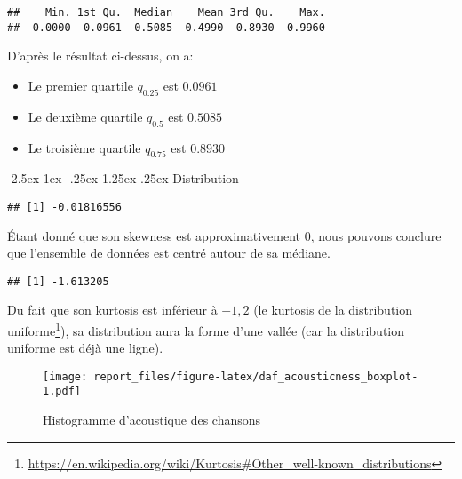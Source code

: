 \documentclass[
  12pt,
]{article}
\makeatletter
\newenvironment{Shaded}{\begin{snugshade}}{\end{snugshade}}
\newcommand{\FunctionTok}[1]{\textcolor[rgb]{0.00,0.00,0.00}{#1}}
\newcommand{\NormalTok}[1]{#1}
\newcommand{\SpecialCharTok}[1]{\textcolor[rgb]{0.00,0.00,0.00}{#1}}
\providecommand{\tightlist}{%
  \setlength{\itemsep}{0pt}\setlength{\parskip}{0pt}}
\renewcommand\paragraph{\@startsection{paragraph}{4}{\z@}%
        {-2.5ex\@plus -1ex \@minus -.25ex}%
        {1.25ex \@plus .25ex}%
        {\normalfont\normalsize\bfseries}}
\makeatother
\begin{document}
\begin{verbatim}
##    Min. 1st Qu.  Median    Mean 3rd Qu.    Max. 
##  0.0000  0.0961  0.5085  0.4990  0.8930  0.9960
\end{verbatim}

D'après le résultat ci-dessus, on a:

\begin{itemize}
\tightlist
\item
  Le premier quartile \(q_{0.25}\) est \(0.0961\)
\item
  Le deuxième quartile \(q_{0.5}\) est \(0.5085\)
\item
  Le troisième quartile \(q_{0.75}\) est \(0.8930\)
\end{itemize}

\hypertarget{distribution}{%
\paragraph{Distribution}\label{distribution}}

\begin{Shaded}
\end{Shaded}

\begin{verbatim}
## [1] -0.01816556
\end{verbatim}

Étant donné que son skewness est approximativement 0, nous pouvons
conclure que l'ensemble de données est centré autour de sa médiane.

\begin{Shaded}
\end{Shaded}

\begin{verbatim}
## [1] -1.613205
\end{verbatim}

Du fait que son kurtosis est inférieur à \(-1,2\) (le kurtosis de la
distribution uniforme\footnote{\url{https://en.wikipedia.org/wiki/Kurtosis\#Other_well-known_distributions}}),
sa distribution aura la forme d'une vallée (car la distribution uniforme
est déjà une ligne).

\begin{figure}
\centering
\texttt{[image: report\_files/figure-latex/daf\_acousticness\_boxplot-1.pdf]}
\caption{Histogramme d'acoustique des chansons}
\end{figure}
\end{document}
